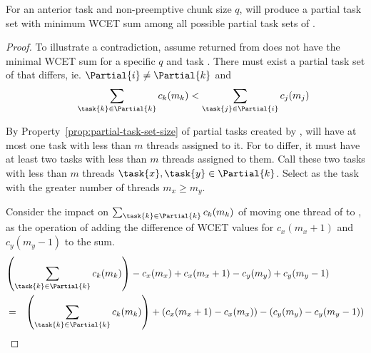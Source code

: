 
%
%

\begin{theorem}
  \label{thm:tpj-wcet-sum}
  For an anterior task  and non-preemptive chunk size ${q}$,
  \texdivide{} will produce a partial task set  with
  minimum WCET sum among all possible partial task sets of .

  \begin{proof} To illustrate a contradiction, assume 
    returned from \texdivide{} does not have the minimal WCET sum
    for a specific ${q}$ and task . There must exist  a partial
    task set  of  that differs, ie. ${\Partial{i}
      \not = \Partial{k}}$ and 
    \begin{equation*}
      \indent
      \sum_{\task{k} \in \Partial{k}} c_k(m_k) <
      \sum_{\task{j} \in \Partial{i}} c_j(m_j)
    \end{equation*}

    By Property~\ref{prop:partial-task-set-size} of partial tasks
    created by \texdivide{},  will have at most one task
    with less than ${m}$ threads assigned to it. For  to
    differ, it must have at least two tasks with less than ${m}$
    threads assigned to them. Call these two tasks with less than
    ${m}$ threads ${\task{x}, \task{y} \in \Partial{k}}$. Select
     as the task with the greater number of threads
    ${m_x \ge m_y}$.

    Consider the impact on ${\sum_{\task{k} \in \Partial{k}}
      c_k(m_k)}$ of moving one thread of  to , as the
    operation of adding the difference of WCET values for
    ${c_x(m_x + 1)}$ and ${c_y(m_y - 1)}$ to the sum. 
    \begin{eqnarray*}
      \lefteqn{
      \left(\sum_{\task{k} \in \Partial{k}} c_k(m_k) \right)
      - c_x(m_x) + c_x(m_x + 1)
      - c_y(m_y) + c_y(m_y - 1)} \\
      & = & \left(\sum_{\task{k} \in \Partial{k}} c_k(m_k) \right)
      + (c_x(m_x + 1) - c_x(m_x)) - (c_y(m_y) - c_y(m_y - 1))
    \end{eqnarray*}
    

\end{proof}
\end{theorem}

